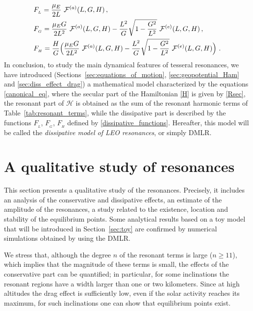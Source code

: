 \documentclass[12pt,reqno]{amsart}
\numberwithin{equation}{section}
\begin{document}
\begin{equation}\label{dissipative_functions}
\begin{split}
&F_{_L}={{\mu_E}\over {2 L}}\ {\mathcal{F}^{(a)}}(L,G,H)\,,\\
&F_{_G}={{\mu_E G}\over {2L^2}}\ \mathcal{F}^{(a)}(L,G,H)-{{ L^2}\over {G}} \sqrt{1-\frac{G^2}{L^2}}\
\mathcal{F}^{(e)}(L,G,H)\,,\\
&F_{_H}=\frac{H}{G}\Bigl({{\mu_E G}\over {2L^2}}\ \mathcal{F}^{(a)}(L,G,H)-
{{ L^2}\over {G}} \sqrt{1-\frac{G^2}{L^2}}\ \mathcal{F}^{(e)}(L,G,H)\Bigr)\ .
\end{split}
\end{equation}
In conclusion, to study the main dynamical features of
tesseral resonances, we have introduced
(Sections~\ref{sec:equations_of_motion}, \ref{sec:geopotential_Ham}
and \ref{sec:diss_effect_drag}) a mathematical model characterized
by the equations \eqref{canonical_eq}, where the secular part of
the Hamiltonian \eqref{H} is given by \eqref{Rsec}, the resonant
part of $\mathcal{H}$  is obtained as the sum of the resonant
harmonic terms of Table~\ref{tab:resonant_terms}, while the
dissipative part is described by the functions $F_{_L}$, $F_{_G}$,
$F_{_H}$ defined by \eqref{dissipative_functions}. Hereafter, this
model will be called the \emph{dissipative model of LEO
resonances}, or simply DMLR.



\section{A qualitative study of resonances}\label{sec:qualitative_resonance}
This section presents a qualitative study of the resonances.  Precisely, it
includes an analysis of the conservative and dissipative effects,
an estimate of the amplitude of the resonances, a study related to the
existence, location and stability of the equilibrium points. Some
analytical results based on a toy model that will be introduced in
Section~\ref{sec:toy} are confirmed by numerical simulations
obtained by using the DMLR.

We stress that, although the degree $n$ of the resonant terms is large ($n\geq 11$),
which implies that the magnitude of these terms is small, the effects of the conservative part can be quantified;
in particular, for some inclinations the resonant regions have
a width larger than one or two kilometers. Since at high altitudes the drag effect is sufficiently low, even if the solar activity reaches its maximum, for such inclinations one can show that equilibrium points exist.
\end{document}
